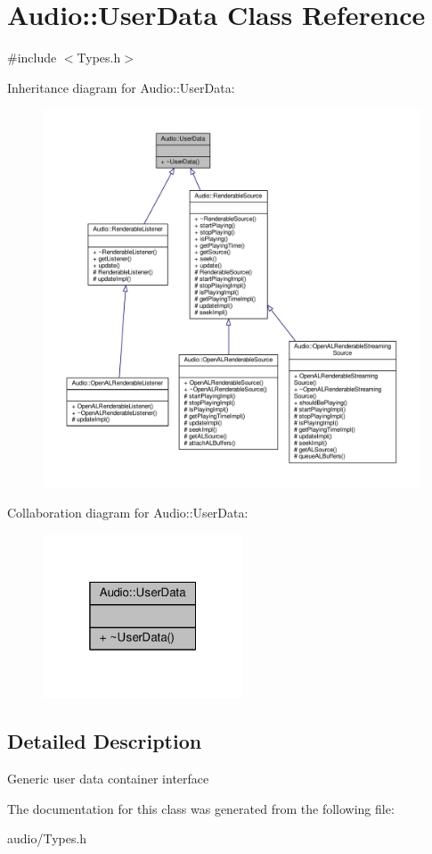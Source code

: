 \hypertarget{classAudio_1_1UserData}{}\section{Audio\+:\+:User\+Data Class Reference}
\label{classAudio_1_1UserData}


{\ttfamily \#include $<$Types.\+h$>$}



Inheritance diagram for Audio\+:\+:User\+Data\+:
\nopagebreak
\begin{figure}[H]
\begin{center}
\leavevmode
\includegraphics[width=350pt]{d4/df1/classAudio_1_1UserData__inherit__graph}
\end{center}
\end{figure}


Collaboration diagram for Audio\+:\+:User\+Data\+:
\nopagebreak
\begin{figure}[H]
\begin{center}
\leavevmode
\includegraphics[width=169pt]{d5/dad/classAudio_1_1UserData__coll__graph}
\end{center}
\end{figure}


\subsection{Detailed Description}
Generic user data container interface 

The documentation for this class was generated from the following file\+:\begin{DoxyCompactItemize}
\item 
audio/Types.\+h\end{DoxyCompactItemize}
